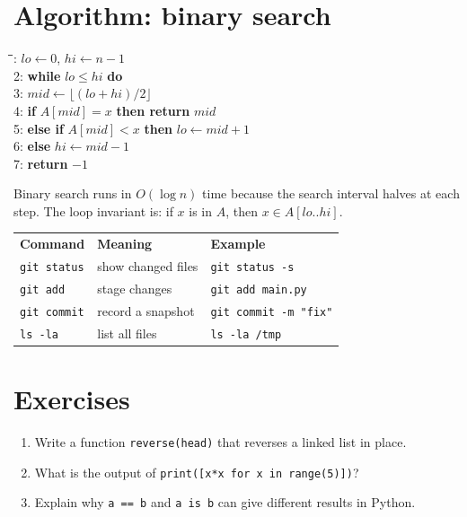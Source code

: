 \documentclass[11pt]{article}
\begin{document}
\section{Algorithm: binary search}
\begin{tcolorbox}[colback=white,colframe=red!60!black,title={Algorithm 1: BinarySearch(A, x)}]
\begin{tabbing}
\quad\=\quad\=\quad\=: $lo \gets 0$, $hi \gets n - 1$\\
2: \textbf{while} $lo \le hi$ \textbf{do}\\
3: \> $mid \gets \lfloor (lo + hi)/2 \rfloor$\\
4: \> \textbf{if} $A[mid] = x$ \textbf{then return} $mid$\\
5: \> \textbf{else if} $A[mid] < x$ \textbf{then} $lo \gets mid + 1$\\
6: \> \textbf{else} $hi \gets mid - 1$\\
7: \textbf{return} $-1$
\end{tabbing}
\end{tcolorbox}
Binary search runs in $O(\log n)$ time because the search interval halves at each step. The loop invariant is: if $x$ is in $A$, then $x \in A[lo..hi]$.
\begin{center}
\begin{tabular}{lll}
\textbf{Command} & \textbf{Meaning} & \textbf{Example}\\
\texttt{git status} & show changed files & \texttt{git status -s}\\
\texttt{git add} & stage changes & \texttt{git add main.py}\\
\texttt{git commit} & record a snapshot & \texttt{git commit -m "fix"}\\
\texttt{ls -la} & list all files & \texttt{ls -la /tmp}\\
\end{tabular}
\end{center}
\section{Exercises}
\begin{enumerate}
\item Write a function \texttt{reverse(head)} that reverses a linked list in place.
\item What is the output of \texttt{print([x*x for x in range(5)])}?
\item Explain why \texttt{a == b} and \texttt{a is b} can give different results in Python.
\end{enumerate}
\end{document}
